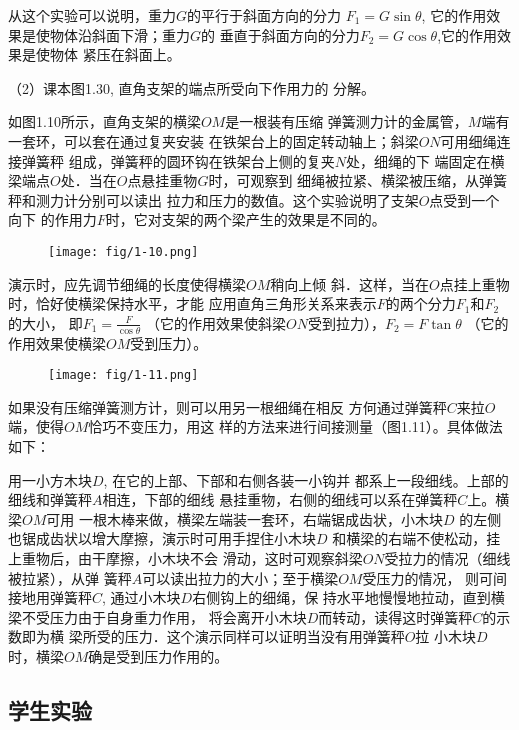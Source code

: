 从这个实验可以说明，重力$G$的平行于斜面方向的分力
$F_1=G\sin\theta$, 它的作用效果是使物体沿斜面下滑；重力$G$的
垂直于斜面方向的分力$F_2=G\cos\theta$,它的作用效果是使物体
紧压在斜面上。

（2）课本图1.30, 直角支架的端点所受向下作用力的
分解。

如图1.10所示，直角支架的横梁$OM$是一根装有压缩
弹簧测力计的金属管，$M$端有一套环，可以套在通过复夹安装
在铁架台上的固定转动轴上；斜梁$ON$可用细绳连接弹簧秤
组成，弹簧秤的圆环钩在铁架台上侧的复夹$N$处，细绳的下
端固定在横梁端点$O$处．当在$O$点悬挂重物$G$时，可观察到
细绳被拉紧、横梁被压缩，从弹簧秤和测力计分别可以读出
拉力和压力的数值。这个实验说明了支架$O$点受到一个向下
的作用力$F$时，它对支架的两个梁产生的效果是不同的。
\begin{figure}[htp]
    \centering
    \texttt{[image: fig/1-10.png]}
    \caption{}
\end{figure}

演示时，应先调节细绳的长度使得横梁$OM$稍向上倾
斜．这样，当在$O$点挂上重物时，恰好使横梁保持水平，才能
应用直角三角形关系来表示$F$的两个分力$F_1$和$F_2$的大小，
即$F_1=\frac{F}{\cos\theta}$
（它的作用效果使斜梁$ON$受到拉力），$F_2=F\tan\theta$
（它的作用效果使横梁$OM$受到压力）。
\begin{figure}[htp]
    \centering
    \texttt{[image: fig/1-11.png]}
    \caption{}
\end{figure}

如果没有压缩弹簧测方计，则可以用另一根细绳在相反
方何通过弹簧秤$C$来拉$O$端，使得$OM$恰巧不变压力，用这
样的方法来进行间接测量（图1.11）。具体做法如下：

用一小方木块$D$, 在它的上部、下部和右侧各装一小钩并
都系上一段细线。上部的细线和弹簧秤$A$相连，下部的细线
悬挂重物，右侧的细线可以系在弹簧秤$C$上。横梁$OM$可用
一根木棒来做，横梁左端装一套环，右端锯成齿状，小木块$D$
的左侧也锯成齿状以增大摩擦，演示时可用手捏住小木块$D$
和横梁的右端不使松动，挂上重物后，由干摩擦，小木块不会
滑动，这时可观察斜梁$ON$受拉力的情况（细线被拉紧），从弹
簧秤$A$可以读出拉力的大小；至于横梁$OM$受压力的情况，
则可间接地用弹簧秤$C$, 通过小木块$D$右侧钩上的细绳，保
持水平地慢慢地拉动，直到横梁不受压力由于自身重力作用，
将会离开小木块$D$而转动，读得这时弹簧秤$C$的示数即为横
梁所受的压力．这个演示同样可以证明当没有用弹簧秤$O$拉
小木块$D$时，横梁$OM$确是受到压力作用的。

\subsection{学生实验}
